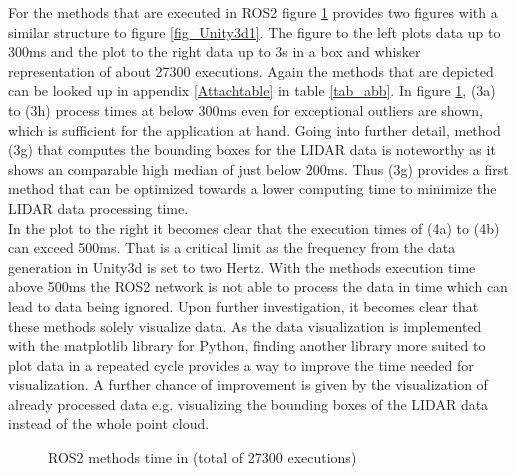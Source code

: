    For the methods that are executed in \ac{ROS2} figure \ref{fig_Ros21} provides two figures with a similar structure to figure \ref{fig_Unity3d1}. The figure to the left plots data up to 300ms and the plot to the right data up to 3s in a box and whisker representation of about 27300 executions. Again the methods that are depicted can be looked up in appendix \ref{Attachtable} in table \ref{tab_abb}. In figure \ref{fig_Ros21}, (3a) to (3h) process times at below 300ms even for exceptional outliers are shown, which is sufficient for the application at hand. Going into further detail, method (3g) that computes the bounding boxes for the \ac{LIDAR} data is noteworthy as it shows an comparable high median of just below 200ms. Thus (3g) provides a first method that can be optimized towards a lower computing time to minimize the \ac{LIDAR} data processing time.\\ 
   
    In the plot to the right it becomes clear that the execution times of (4a) to (4b) can exceed 500ms. That is a critical limit as the frequency from the data generation in Unity3d is set to two Hertz. With the methods execution time above 500ms the \ac{ROS2} network is not able to process the data in time which can lead to data being ignored. Upon further investigation, it becomes clear that these methods solely visualize data. As the data visualization is implemented with the matplotlib library for Python, finding another library more suited to plot data in a repeated cycle provides a way to improve the time needed for visualization. A further chance of improvement is given by the visualization of already processed data e.g. visualizing the bounding boxes of the \ac{LIDAR} data instead of the whole point cloud.
	\begin{figure}
		\begin{center}
			\caption{ROS2 methods time in (total of 27300 executions)}
			\label{fig_Ros21}%
		\end{center}
	\end{figure}


